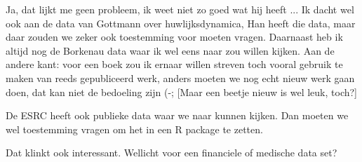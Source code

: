 Ja, dat lijkt me geen probleem, ik weet niet zo goed wat hij heeft ...
Ik dacht wel ook aan de data van Gottmann over huwlijksdynamica, Han
heeft die data, maar daar zouden we zeker ook toestemming voor moeten
vragen.  Daarnaast heb ik altijd nog de Borkenau data waar ik wel eens
naar zou willen kijken.  Aan de andere kant: voor een boek zou ik
ernaar willen streven toch vooral gebruik te maken van reeds
gepubliceerd werk, anders moeten we nog echt nieuw werk gaan doen, dat
kan niet de bedoeling zijn (-; [Maar een beetje nieuw is wel leuk,
toch?]

De ESRC heeft ook publieke data waar we naar kunnen kijken.  Dan
moeten we wel toestemming vragen om het in een R package te zetten.

Dat klinkt ook interessant.  Wellicht voor een financiele of medische
data set?
 